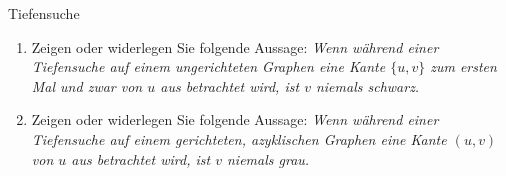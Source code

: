 \documentclass[11pt,a4paper]{article}
\begin{document}
\thispagestyle{empty}
\DeclareRobustCommand{\ttfamily}{\fontencoding{T1}\fontfamily{lmtt}\selectfont}

\newcommand{\quotes}[1]{\glqq{}#1\grqq{}}




\begin{aufgabe}{1}{Tiefensuche}
    \begin{enumerate}
        \item Zeigen oder widerlegen Sie folgende Aussage:
        \emph{Wenn während einer Tiefensuche auf einem ungerichteten Graphen eine Kante $\{u, v\}$ zum ersten Mal und zwar von $u$ aus betrachtet wird, ist $v$ niemals schwarz.}
        \item Zeigen oder widerlegen Sie folgende Aussage:
        \emph{Wenn während einer Tiefensuche auf einem gerichteten, azyklischen Graphen eine Kante $(u, v)$ von $u$ aus betrachtet wird, ist $v$ niemals grau.}
    \end{enumerate}
\end{aufgabe}
\end{document}
